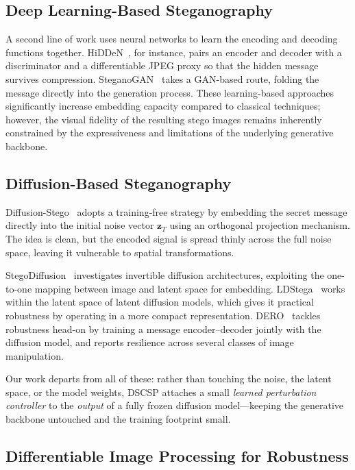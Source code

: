 \documentclass[conference]{IEEEtran}
\begin{document}
\subsection{Deep Learning-Based Steganography}

A second line of work uses neural networks to learn the encoding and decoding functions together.
HiDDeN~\cite{zhu2018hidden}, for instance, pairs an encoder and decoder with a discriminator and a differentiable JPEG proxy so that the hidden message survives compression.
SteganoGAN~\cite{zhang2019steganogan} takes a GAN-based route, folding the message directly into the generation process.
These learning-based approaches significantly increase embedding capacity compared to classical techniques; however, the visual fidelity of the resulting stego images remains inherently constrained by the expressiveness and limitations of the underlying generative backbone.

\subsection{Diffusion-Based Steganography}

Diffusion-Stego~\cite{wei2023diffusionstego} adopts a training-free strategy by embedding the secret message directly into the initial noise vector $\mathbf{z}_T$ using an orthogonal projection mechanism.
The idea is clean, but the encoded signal is spread thinly across the full noise space, leaving it vulnerable to spatial transformations.

StegoDiffusion~\cite{peng2023stegodiffusion} investigates invertible diffusion architectures, exploiting the one-to-one mapping between image and latent space for embedding.
LDStega~\cite{zhang2024ldstega} works within the latent space of latent diffusion models, which gives it practical robustness by operating in a more compact representation.
DERO~\cite{zhao2024dero} tackles robustness head-on by training a message encoder--decoder jointly with the diffusion model, and reports resilience across several classes of image manipulation.

Our work departs from all of these: rather than touching the noise, the latent space, or the model weights, DSCSP attaches a small \emph{learned perturbation controller} to the \emph{output} of a fully frozen diffusion model---keeping the generative backbone untouched and the training footprint small.

\subsection{Differentiable Image Processing for Robustness}
\end{document}
